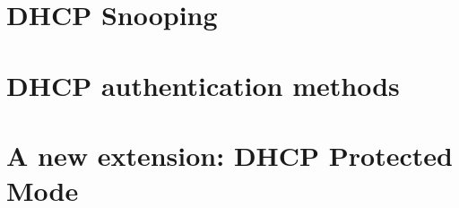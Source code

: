 \documentclass[letterpaper, 10 pt, conference]{ieeeconf}  %
\begin{document}
\section{DHCP Snooping}\label{sec:dhcp-snooping}
\section{DHCP authentication methods}\label{sec:auth}
\section{A new extension: DHCP Protected Mode}\label{sec:protected-mode}

\addtolength{\textheight}{-12cm}   %




\end{document}
